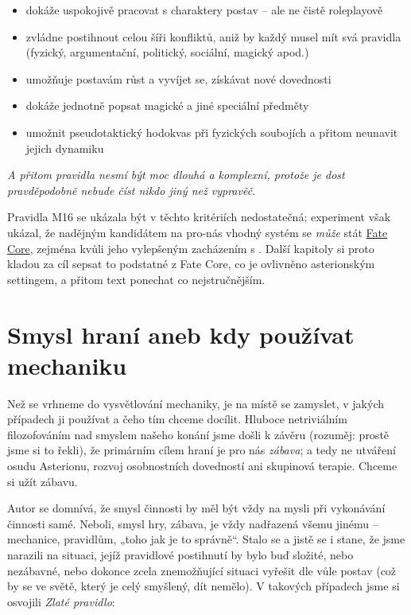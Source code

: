 \documentclass[../main.tex]{subfiles}
\begin{document}
\begin{itemize}
\item dokáže uspokojivě pracovat s charaktery postav – ale ne čistě roleplayově
\item zvládne postihnout celou šíři konfliktů, aniž by každý musel mít svá pravidla (fyzický, argumentační, politický, sociální, magický apod.)
\item umožňuje postavám růst a vyvíjet se, získávat nové dovednosti
\item dokáže jednotně popsat magické a jiné speciální předměty
\item umožnit pseudotaktický hodokvas při fyzických soubojích a přitom neunavit jejich dynamiku
\end{itemize}

\textit{A přitom pravidla nesmí být moc dlouhá a komplexní, protože je dost pravděpodobně nebude číst nikdo jiný než vypravěč.}

\begin{sloppypar}
Pravidla M16 se ukázala být v těchto kritériích nedostatečná; experiment však ukázal, že nadějným kandidátem na pro-nás vhodný systém se \textit{může} stát \href{https://fate.nepocitacovehry.cz/?do=StahniFC}{Fate Core}, zejména kvůli jeho vylepšeným zacházením s .  Další kapitoly si proto kladou za cíl sepsat to podstatné z Fate Core, co je ovlivněno asterionským settingem, a přitom text ponechat co nejstručnějším. 
\end{sloppypar}

\section{Smysl hraní aneb kdy používat mechaniku}
\label{sec:proc}

\begin{sloppypar}
Než se vrhneme do vysvětlování mechaniky, je na místě se zamyslet, v jakých případech ji používat a čeho tím chceme docílit. Hluboce netriviálním filozofováním nad smyslem našeho konání jsme došli k závěru (rozuměj: prostě jsme si to řekli), že primárním cílem hraní je pro nás \emph{zábava}; a tedy ne utváření osudu Asterionu, rozvoj osobnostních dovedností ani skupinová terapie. Chceme si užít zábavu.
\end{sloppypar}

Autor se domnívá, že smysl činnosti by měl být vždy na mysli při vykonávání činnosti samé. Neboli, smysl hry, zábava, je vždy nadřazená všemu jinému – mechanice, pravidlům, „toho jak je to správně“. Stalo se a jistě se i stane, že jsme narazili na situaci, jejíž pravidlové postihnutí by bylo buď složité, nebo nezábavné, nebo dokonce zcela znemožňující situaci vyřešit dle vůle postav (což by se ve světě, který je celý smyšlený, dít nemělo). V takových případech jsme si osvojili \emph{Zlaté pravidlo}:
\end{document}
